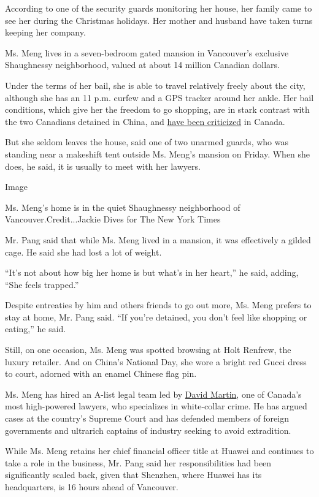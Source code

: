 According to one of the security guards monitoring her house, her family
came to see her during the Christmas holidays. Her mother and husband
have taken turns keeping her company.

Ms. Meng lives in a seven-bedroom gated mansion in Vancouver's exclusive
Shaughnessy neighborhood, valued at about 14 million Canadian dollars.

Under the terms of her bail, she is able to travel relatively freely
about the city, although she has an 11 p.m. curfew and a GPS tracker
around her ankle. Her bail conditions, which give her the freedom to go
shopping, are in stark contrast with the two Canadians detained in
China, and
\href{https://www.nytimes.com/2019/03/04/world/canada/huawei-canada-meng-wanzhou.html}{have
been criticized} in Canada.

But she seldom leaves the house, said one of two unarmed guards, who was
standing near a makeshift tent outside Ms. Meng's mansion on Friday.
When she does, he said, it is usually to meet with her lawyers.

Image

Ms. Meng's home is in the quiet Shaughnessy neighborhood of
Vancouver.Credit...Jackie Dives for The New York Times

Mr. Pang said that while Ms. Meng lived in a mansion, it was effectively
a gilded cage. He said she had lost a lot of weight.

``It's not about how big her home is but what's in her heart,'' he said,
adding, ``She feels trapped.''

Despite entreaties by him and others friends to go out more, Ms. Meng
prefers to stay at home, Mr. Pang said. ``If you're detained, you don't
feel like shopping or eating,'' he said.

Still, on one occasion, Ms. Meng was spotted browsing at Holt Renfrew,
the luxury retailer. And on China's National Day, she wore a bright red
Gucci dress to court, adorned with an enamel Chinese flag pin.

Ms. Meng has hired an A-list legal team led by
\href{https://martinandassociates.ca/experience/}{David Martin}, one of
Canada's most high-powered lawyers, who specializes in white-collar
crime. He has argued cases at the country's Supreme Court and has
defended members of foreign governments and ultrarich captains of
industry seeking to avoid extradition.

While Ms. Meng retains her chief financial officer title at Huawei and
continues to take a role in the business, Mr. Pang said her
responsibilities had been significantly scaled back, given that
Shenzhen, where Huawei has its headquarters, is 16 hours ahead of
Vancouver.

